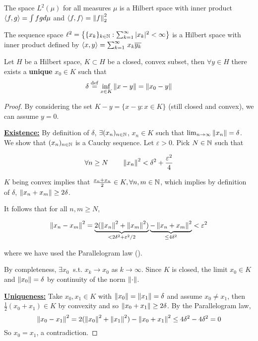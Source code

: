 \documentclass{article}
\begin{document}
\begin{example}[$L^2-$spaces]
The space $L^2(\mu)$ for all measures $\mu$ is a Hilbert space with inner product $\left<{f},{g}\right>=\int fg d\mu$ and $\left<{f},{f}\right>=\left\|{f}\right\|_2^2$    
\end{example}

\begin{example}[$l^2-$spaces]
The sequence space
	$\ell^2=
		\left\{\{x_k\}_{k\in \mathbb{N}}:\sum_{k=1}^\infty |x_k|^2<\infty \right\}$
	is a Hilbert space with inner product defined by 
	$
		\left<{x},{y}\right>=\sum_{k=1}^\infty \,{x_k \overline{y_k}}
	$
\end{example}

\begin{theorem}
\nextline
\label{nearest point}
	Let $H$ be a Hilbert space, $K\subset H$ be a closed, convex subset, then $\forall y \in H$ there exists a {\bf{unique}} $x_0\in K$ such that
	$$
		\delta \overset{\rm{def}}{=} \inf_{x\in K} \left\|{x-y}\right\| = \left\|{x_0-y}\right\|
	$$
\end{theorem}

\begin{proof} 
By considering the set $K-y = \{x-y: x\in K\}$ (still closed and convex), we can assume $y=0$.  

\underline{\textbf{Existence:}}\nl
By definition of $\delta$, $\exists (x_n)_{n \in \mathbb{N}}$, $x_n\in K$ such that $\lim_{n \to \infty} \left\|{x_n}\right\|=\delta$. We show that $(x_n)_{n \in \mathbb{N}}$ is a Cauchy sequence. Let $\varepsilon >0$. Pick $N \in \mathbb{N}$ such that  

$$
\forall n \geq N \qquad \left\|{x_n}\right\|^2 < \delta^2 + \frac{\varepsilon^2}{4}
$$  

$K$ being convex implies that $\frac{x_n+x_n}{2} \in K, \forall n,m \in \mathbb{N}$, which implies by definition of $\delta$, $\left\|{x_n+x_m}\right\| \geq 2\delta$.  

It follows that for all $n,m \geq N$,  

\begin{equation*}
    \left\|{x_n-x_m}\right\|^2 = \underbrace{2(\left\|{x_n}\right\|^2+\left\|{x_m}\right\|^2)}_{< 2\delta^2 + \varepsilon^2 /2} \underbrace{-\left\|{x_n+x_m}\right\|^2}_{\leq 4\delta^2} < \varepsilon^2
\end{equation*}  

where we have used the Parallelogram law ().  

By completeness, $\exists x_0 \ $ s.t. $x_k \to x_0$ as $k \to \infty$. Since $K$ is closed, the limit $x_0\in K$ and $\left\|{x_0}\right\|=\delta$ by continuity of the norm $\left\|{\cdot}\right\|$.  

\underline{\textbf{Uniqueness:}}\nl
Take $x_0, x_1 \in K$ with $\left\|{x_0}\right\|=\left\|{x_1}\right\|=\delta$ and assume $x_0\neq x_1$, then $\frac{1}{2}(x_0+x_1) \in K$ by convexity and so $\left\|{x_0+x_1}\right\|\geq 2\delta$. By the Parallelogram law,  
$$
\left\|{x_0-x_1}\right\|^2 = 2(\left\|{x_0}\right\|^2 + \left\|{x_1}\right\|^2) - \left\|{x_0+x_1}\right\|^2 \leq 4\delta^2-4\delta^2= 0
$$  
So $x_0=x_1$, a contradiction.
\end{proof}  
\end{document}
